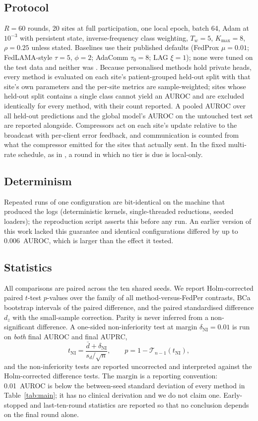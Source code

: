 \subsection{Protocol}
$R=60$ rounds, 20 sites at full participation, one local epoch, batch 64, Adam at $10^{-3}$ with persistent state, inverse-frequency class weighting, $T_w=5$, $K_{\max}=8$, $\rho=0.25$ unless stated. Baselines use their published defaults (FedProx $\mu=0.01$; FedLAMA-style $\tau=5$, $\phi=2$; AdaComm $\tau_0=8$; LAG $\xi=1$); none were tuned on the test data and neither was \tierfed{}. Because personalised methods hold private heads, every method is evaluated on each site's patient-grouped held-out split with that site's own parameters and the per-site metrics are sample-weighted; sites whose held-out split contains a single class cannot yield an AUROC and are excluded identically for every method, with their count reported. A pooled AUROC over all held-out predictions and the global model's AUROC on the untouched test set are reported alongside. Compressors act on each site's update relative to the broadcast with per-client error feedback, and communication is counted from what the compressor emitted for the sites that actually sent. In the fixed multi-rate schedule, as in \tierfed{}, a round in which no tier is due is local-only.

\subsection{Determinism}
Repeated runs of one configuration are bit-identical on the machine that produced the logs (deterministic kernels, single-threaded reductions, seeded loaders); the reproduction script asserts this before any run. An earlier version of this work lacked this guarantee and identical configurations differed by up to 0.006~AUROC, which is larger than the effect it tested.

\subsection{Statistics}
All comparisons are paired across the ten shared seeds. We report Holm-corrected paired $t$-test $p$-values over the family of all method-versus-FedPer contrasts, BCa bootstrap intervals of the paired difference, and the paired standardised difference $d_z$ with the small-sample correction. Parity is never inferred from a non-significant difference. A one-sided non-inferiority test at margin $\delta_{\mathrm{NI}}=0.01$ is run on \emph{both} final AUROC and final AUPRC,
\begin{equation}
t_{\mathrm{NI}}=\frac{\bar d+\delta_{\mathrm{NI}}}{s_d/\sqrt n},\qquad p=1-\mathcal T_{n-1}(t_{\mathrm{NI}}),
\label{eq:ni}
\end{equation}
and the non-inferiority tests are reported uncorrected and interpreted against the Holm-corrected difference tests. The margin is a reporting convention: 0.01~AUROC is below the between-seed standard deviation of every method in Table~\ref{tab:main}; it has no clinical derivation and we do not claim one. Early-stopped and last-ten-round statistics are reported so that no conclusion depends on the final round alone.
